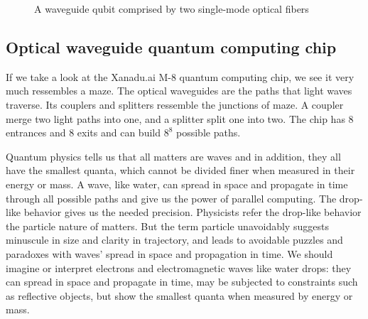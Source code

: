 \documentclass[Letter,11pt]{book}
\begin{document}
\begin{figure}[ht]\label{Fiber}
\caption{A waveguide qubit comprised by two single-mode optical fibers}
\end{figure}

\subsection{Optical waveguide quantum computing chip}
If we take a look at the Xanadu.ai M-8 quantum computing chip, we see it very much ressembles a maze. The optical waveguides are the paths that light waves traverse. Its couplers and splitters ressemble the junctions of maze. A coupler merge two light paths into one, and a splitter split one into two. The chip has 8 entrances and 8 exits and can build $8^8$ possible paths.

Quantum physics tells us that all matters are waves and in addition, they all have the smallest quanta, which cannot be divided finer when measured in their energy or mass. A wave, like water, can spread in space and propagate in time through all possible paths and give us the power of parallel computing. The drop-like behavior gives us the needed precision. Physicists refer the drop-like behavior the particle nature of matters. But the term particle unavoidably suggests minuscule in size and clarity in trajectory, and leads to avoidable puzzles and paradoxes with waves' spread in space and propagation in time. We should imagine or interpret electrons and electromagnetic waves like water drops: they can spread in space and propagate in time, may be subjected to constraints such as reflective objects, but show the smallest quanta when measured by energy or mass.
\end{document}

